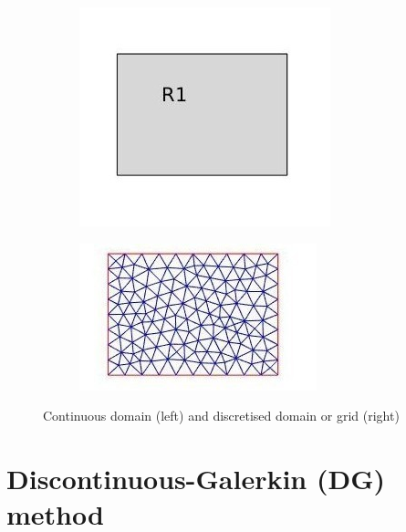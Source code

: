 \documentclass[a4paper,twoside,openright]{book}
\begin{document}
\begin{figure}[H]
\begin{subfigure}{0.5\textwidth}
\centering
  \includegraphics[width=\linewidth]{domain.jpg}
  \label{fig:Domain}
\end{subfigure}
\begin{subfigure}{0.5\textwidth}	
\centering
  \includegraphics[width=\linewidth]{grid.jpg}
  \label{fig:Mesh}
\end{subfigure}
\caption{Continuous domain (left) and discretised domain or grid (right)}
\label{fig:continuous_grid_figure}
\end{figure}

\section{Discontinuous-Galerkin (DG) method}
\end{document}
